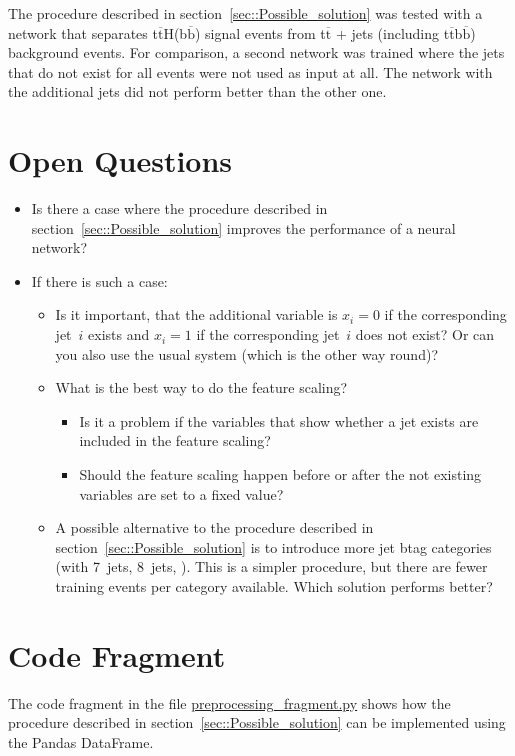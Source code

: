 \documentclass[12pt,a4paper]{article}
\begin{document}
The procedure described in section~\ref{sec::Possible_solution} was tested with a network that separates t$\overline{\text{t}}$H(b$\overline{\text{b}}$) signal events from t$\overline{\text{t}}$ + jets (including t$\overline{\text{t}}$b$\overline{\text{b}}$) background events. For comparison, a second network was trained where the jets that do not exist for all events were not used as input at all. The network with the additional jets did not perform better than the other one.


\section{Open Questions}

\begin{itemize}
\item Is there a case where the procedure described in section~\ref{sec::Possible_solution} improves the performance of a neural network?
\item If there is such a case:
\begin{itemize}
\item Is it important, that the additional variable is $x_i = 0$ if the corresponding jet~$i$ exists and $x_i = 1$ if the corresponding jet~$i$ does not exist? Or can you also use the usual system (which is the other way round)?
\item What is the best way to do the feature scaling?
\begin{itemize}
\item Is it a problem if the variables that show whether a jet exists are included in the feature scaling?
\item Should the feature scaling happen before or after the not existing variables are set to a fixed value?
\end{itemize}
\item A possible alternative to the procedure described in section~\ref{sec::Possible_solution} is to introduce more jet btag categories (with 7~jets, 8~jets, \textellipsis\unkern). This is a simpler procedure, but there are fewer training events per category available. Which solution performs better?
\end{itemize}
\end{itemize}


\section{Code Fragment}

The code fragment in the file \url{preprocessing_fragment.py} shows how the procedure described in section~\ref{sec::Possible_solution} can be implemented using the Pandas DataFrame.
\end{document}
